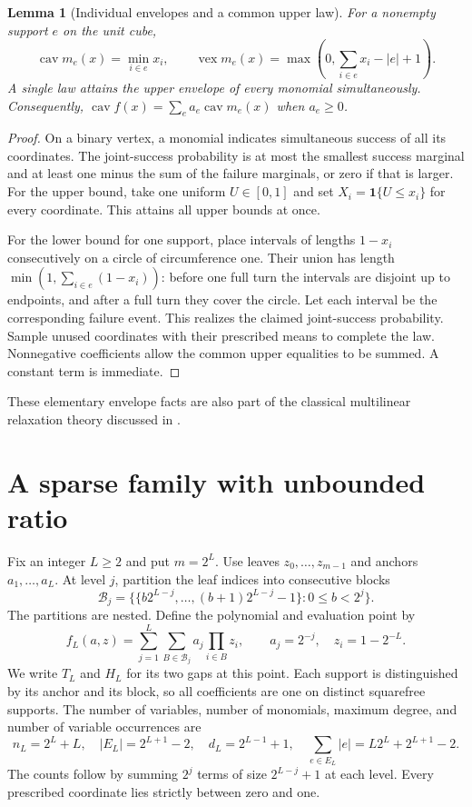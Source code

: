 \documentclass[11pt]{article}
\newtheorem{lemma}[theorem]{Lemma}
\theoremstyle{remark}
\DeclareMathOperator{\vex}{vex}
\DeclareMathOperator{\cav}{cav}
\newcommand{\ind}{\mathbf 1}
\begin{document}
\begin{lemma}[Individual envelopes and a common upper law]\label{lem:monomial}
For a nonempty support $e$ on the unit cube,
\begin{equation}\label{eq:monomial}
 \cav m_e(x)=\min_{i\in e}x_i,
 \qquad \vex m_e(x)=\max\left(0,\sum_{i\in e}x_i-|e|+1\right).
\end{equation}
A single law attains the upper envelope of every monomial simultaneously.
Consequently, $\cav f(x)=\sum_e a_e\cav m_e(x)$ when $a_e\ge0$.
\end{lemma}
\begin{proof}
On a binary vertex, a monomial indicates simultaneous success of all its
coordinates. The joint-success probability is at most the smallest
success marginal and at least one minus the sum of the failure marginals,
or zero if that is larger. For the upper bound, take one uniform
$U\in[0,1]$ and set $X_i=\ind\{U\le x_i\}$ for every coordinate.
This attains all upper bounds at once.

For the lower bound for one support, place intervals of lengths $1-x_i$
consecutively on a circle of circumference one. Their union has length
$\min(1,\sum_{i\in e}(1-x_i))$: before one full turn the intervals are
disjoint up to endpoints, and after a full turn they cover the circle.
Let each interval be the corresponding failure event. This realizes
the claimed joint-success probability. Sample unused coordinates with
their prescribed means to complete the law. Nonnegative coefficients
allow the common upper equalities to be summed. A constant term is
immediate.
\end{proof}

These elementary envelope facts are also part of the classical
multilinear relaxation theory discussed in \citet{Luedtke2012}.

\section{A sparse family with unbounded ratio}\label{sec:disproof}
Fix an integer $L\ge2$ and put $m=2^L$. Use leaves $z_0,\ldots,z_{m-1}$
and anchors $a_1,\ldots,a_L$. At level $j$, partition the leaf indices
into consecutive blocks
\[
 \mathcal B_j=\bigl\{\{b2^{L-j},\ldots,(b+1)2^{L-j}-1\}:
                       0\le b<2^j\bigr\}.
\]
The partitions are nested. Define the polynomial and evaluation point by
\begin{equation}\label{eq:family}
 f_L(a,z)=\sum_{j=1}^L\sum_{B\in\mathcal B_j}a_j\prod_{i\in B}z_i,
 \qquad a_j=2^{-j},\quad z_i=1-2^{-L}.
\end{equation}
We write $T_L$ and $H_L$ for its two gaps at this point. Each support is
distinguished by its anchor and its block, so all coefficients are one
on distinct squarefree supports. The number of variables, number of
monomials, maximum degree, and number of variable occurrences are
\begin{equation}\label{eq:sizes}
 n_L=2^L+L,\quad |E_L|=2^{L+1}-2,\quad
 d_L=2^{L-1}+1,\quad
 \sum_{e\in E_L}|e|=L2^L+2^{L+1}-2.
\end{equation}
The counts follow by summing $2^j$ terms of size $2^{L-j}+1$ at each
level. Every prescribed coordinate lies strictly between zero and one.
\end{document}

